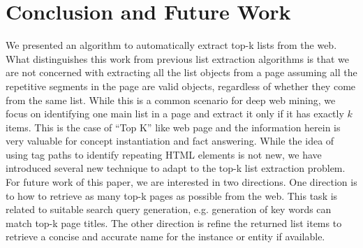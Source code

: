 \section{Conclusion and Future Work}
We presented an algorithm to automatically extract top-k lists from
the web. What distinguishes this work from previous list extraction
algorithms is that we are not concerned with extracting all the list objects
from a page assuming all the repetitive segments in the page are valid objects,
regardless of whether they come from the same list. While this is a common
scenario for deep web mining, we focus on identifying one main list in 
a page and extract it only if it has exactly $k$ items. This is the case
of ``Top K'' like web page and the information herein is very valuable for
concept instantiation and fact answering. While the idea of using 
tag paths to identify repeating HTML elements is not new, 
we have introduced several new technique to adapt to the top-k list extraction
problem. For future work of this paper, we are interested in
two directions. One direction is to how to retrieve as many top-k pages as
possible from the web. This task is related to suitable search
query generation, e.g. generation of key words can match top-k page titles.
The other direction is refine the returned list items to retrieve a concise
and accurate name for the instance or entity if available.

